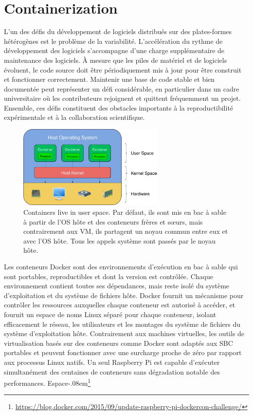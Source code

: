 \section{Containerization}\label{sec:containerization}

L'un des défis du développement de logiciels distribués sur des plates-formes hétérogènes est le problème de la variabilité. L'accélération du rythme de développement des logiciels s'accompagne d'une charge supplémentaire de maintenance des logiciels. À mesure que les piles de matériel et de logiciels évoluent, le code source doit être périodiquement mis à jour pour être construit et fonctionner correctement. Maintenir une base de code stable et bien documentée peut représenter un défi considérable, en particulier dans un cadre universitaire où les contributeurs rejoignent et quittent fréquemment un projet. Ensemble, ces défis constituent des obstacles importants à la reproductibilité expérimentale et à la collaboration scientifique.

\begin{figure}[ht]
\centrer
\includegraphics[width=0.65\textwidth]{../figures/user_kernel_hardware.png}
\caption{Containers live in user space. Par défaut, ils sont mis en bac à sable à partir de l'OS hôte et des conteneurs frères et sœurs, mais contrairement aux VM, ils partagent un noyau commun entre eux et avec l'OS hôte. Tous les appels système sont passés par le noyau hôte.}
\label{fig:user_kernel_hardware}
\end{figure}

Les conteneurs Docker sont des environnements d'exécution en bac à sable qui sont portables, reproductibles et dont la version est contrôlée. Chaque environnement contient toutes ses dépendances, mais reste isolé du système d'exploitation et du système de fichiers hôte. Docker fournit un mécanisme pour contrôler les ressources auxquelles chaque conteneur est autorisé à accéder, et fournit un espace de noms Linux séparé pour chaque conteneur, isolant efficacement le réseau, les utilisateurs et les montages du système de fichiers du système d'exploitation hôte. Contrairement aux machines virtuelles, les outils de virtualisation basés sur des conteneurs comme Docker sont adaptés aux SBC portables et peuvent fonctionner avec une surcharge proche de zéro par rapport aux processus Linux natifs. Un seul Raspberry Pi est capable d'exécuter simultanément des centaines de conteneurs sans dégradation notable des performances. Espace{-.08em}\footnote{\url{https://blog.docker.com/2015/09/update-raspberry-pi-dockercon-challenge/}}

